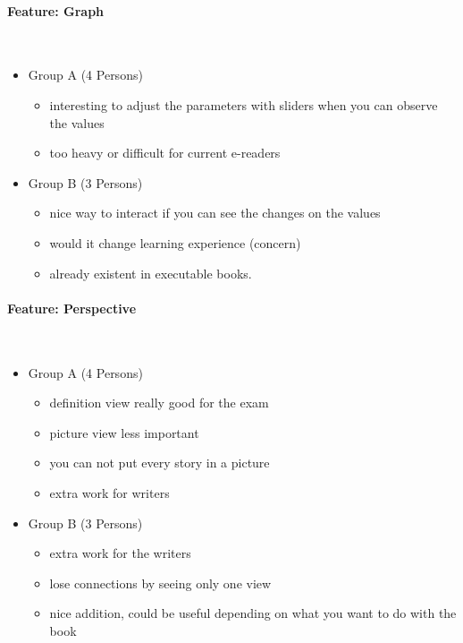 \documentclass[main.tex]{subfiles}
\begin{document}
\paragraph{Feature: Graph}~
\begin{itemize}
	\item Group A (4 Persons)
		\begin{itemize}
			\item interesting to adjust the parameters with sliders when you can observe the values
			\item too heavy or difficult for current e-readers
		\end{itemize}
	\item Group B (3 Persons)
		\begin{itemize}
			\item nice way to interact if you can see the changes on the values
			\item would it change learning experience (concern)
			\item already existent in executable books.
		\end{itemize}
\end{itemize}

\paragraph{Feature: Perspective}~
\begin{itemize}
	\item Group A (4 Persons)
		\begin{itemize}
			\item definition view really good for the exam
			\item picture view less important
			\item you can not put every story in a picture
			\item extra work for writers
		\end{itemize}
	\item Group B (3 Persons)
		\begin{itemize}
			\item extra work for the writers
			\item lose connections by seeing only one view
			\item nice addition, could be useful depending on what you want to do with the book
		\end{itemize}
\end{itemize}
\end{document}

